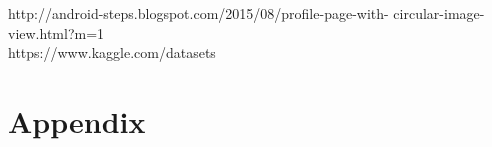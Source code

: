 \documentclass[a4paper,12pt,toc=flat]{report}
\begin{document}
\subitem[14]http://android-steps.blogspot.com/2015/08/profile-page-with-
circular-image-view.html?m=1\\
	\subitem	[15]https://www.kaggle.com/datasets\\
		
		

\pagebreak


 \section{Appendix}{
 }
	
\end{document}
